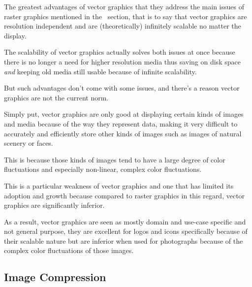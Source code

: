 \documentclass[12pt]{article}
\newcommand{\sentence}{} %
\newcommand{\italic}[1]{\textit{#1}}
\begin{document}
    \bigskip
    The greatest advantages of vector graphics that they address the main issues of raster graphics mentioned in
    the~ section, that is to say that vector graphics are resolution independent and
    are (theoretically) infinitely scalable no matter the display.
    \sentence
    The scalability of vector graphics actually solves both issues at once because there is no longer a need for
    higher resolution media thus saving on disk space \italic{and} keeping old media still usable because of infinite
    scalability.
    \sentence
    But such advantages don't come with some issues, and there's a reason vector graphics are not the current norm.
    \sentence
    Simply put, vector graphics are only good at displaying certain kinds of images and media because of the way they
    represent data, making it very difficult to accurately and efficiently store other kinds of images such as images
    of natural scenery or faces.
    \sentence
    This is because those kinds of images tend to have a large degree of color fluctuations and especially
    non-linear, complex color fluctuations.
    \sentence
    This is a particular weakness of vector graphics and one that has limited its adoption and growth because
    compared to raster graphics in this regard, vector graphics are significantly inferior.
    \sentence
    As a result, vector graphics are seen as mostly domain and use-case specific and not general purpose, they are
    excellent for logos and icons specifically because of their scalable nature but are inferior when used for
    photographs because of the complex color fluctuations of those images.



    \subsection{Image Compression}\label{subsec:image-compression}
\end{document}
